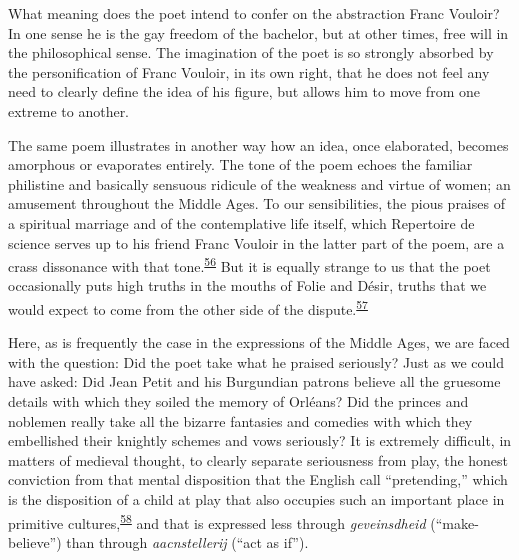 What meaning does the poet intend to confer on the abstraction Franc
Vouloir? In one sense he is the gay freedom of the bachelor, but at
other times, free will in the philosophical sense. The imagination of
the poet is so strongly absorbed by the personification of Franc
Vouloir, in its own right, that he does not feel any need to clearly
define the idea of his figure, but allows him to move from one extreme
to another.

The same poem illustrates in another way how an idea, once elaborated,
becomes amorphous or evaporates entirely. The tone of the poem echoes
the familiar philistine and basically sensuous ridicule of the weakness
and virtue of women; an amusement throughout the Middle Ages. To our
sensibilities, the pious praises of a spiritual marriage and of the
contemplative life itself, which Repertoire de science serves up to his
friend Franc Vouloir in the latter part of the poem, are a crass
dissonance with that
tone.\textsuperscript{\protect\hypertarget{18_Chapter_Eleven__THE_FORMS_OF_THO.xhtmlux5cux23id_521}{\protect\hyperlink{23_NOTES.xhtmlux5cux23id_522}{56}}}
But it is equally strange to us that the poet occasionally puts high
truths in the mouths of Folie and Désir, truths that we would expect to
come from the other side of the
dispute.\textsuperscript{\protect\hypertarget{18_Chapter_Eleven__THE_FORMS_OF_THO.xhtmlux5cux23id_519}{\protect\hyperlink{23_NOTES.xhtmlux5cux23id_520}{57}}}

Here, as is frequently the case in the expressions of the Middle Ages,
we are faced with the question: Did the poet take what he praised
seriously? Just as we could have asked: Did Jean Petit and his
Burgundian patrons believe all the gruesome details with which they
soiled the memory of Orléans? Did the princes and noblemen really take
all the bizarre fantasies and comedies with which they embellished their
knightly schemes and vows seriously? It is extremely difficult, in
matters of medieval thought, to clearly separate seriousness from play,
the honest conviction from that mental disposition that the English call
``pretending,'' which is the disposition of a child at play that also
occupies such an important place in primitive
cultures,\textsuperscript{\protect\hypertarget{18_Chapter_Eleven__THE_FORMS_OF_THO.xhtmlux5cux23id_517}{\protect\hyperlink{23_NOTES.xhtmlux5cux23id_518}{58}}}
and that is expressed less through \emph{geveinsdheid}
(``make-believe'') than through \emph{aacnstellerij} (``act as if'').

